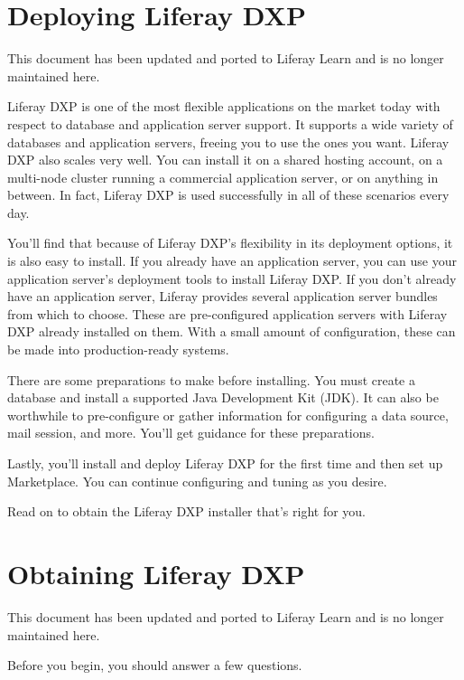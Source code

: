 \chapter{Deploying Liferay DXP}\label{deploying-liferay-dxp}

{This document has been updated and ported to Liferay Learn and is no
longer maintained here.}

Liferay DXP is one of the most flexible applications on the market today
with respect to database and application server support. It supports a
wide variety of databases and application servers, freeing you to use
the ones you want. Liferay DXP also scales very well. You can install it
on a shared hosting account, on a multi-node cluster running a
commercial application server, or on anything in between. In fact,
Liferay DXP is used successfully in all of these scenarios every day.

You'll find that because of Liferay DXP's flexibility in its deployment
options, it is also easy to install. If you already have an application
server, you can use your application server's deployment tools to
install Liferay DXP. If you don't already have an application server,
Liferay provides several application server bundles from which to
choose. These are pre-configured application servers with Liferay DXP
already installed on them. With a small amount of configuration, these
can be made into production-ready systems.

There are some preparations to make before installing. You must create a
database and install a supported Java Development Kit (JDK). It can also
be worthwhile to pre-configure or gather information for configuring a
data source, mail session, and more. You'll get guidance for these
preparations.

Lastly, you'll install and deploy Liferay DXP for the first time and
then set up Marketplace. You can continue configuring and tuning as you
desire.

Read on to obtain the Liferay DXP installer that's right for you.

\chapter{Obtaining Liferay DXP}\label{obtaining-liferay-dxp}

{This document has been updated and ported to Liferay Learn and is no
longer maintained here.}

Before you begin, you should answer a few questions.

